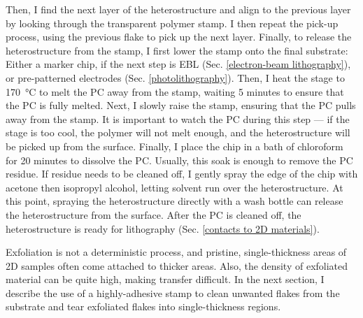 \documentclass[double,12pt,1in,seploa]{beavtex}
\begin{document}
Then, I find the next layer of the heterostructure and align to the previous layer by looking through the transparent polymer stamp. I then repeat the pick-up process, using the previous flake to pick up the next layer. Finally, to release the heterostructure from the stamp, I first lower the stamp onto the final substrate: Either a marker chip, if the next step is EBL (Sec. \ref{electron-beam lithography}), or pre-patterned electrodes (Sec. \ref{photolithography}). Then, I heat the stage to \SI{170}{\celsius} to melt the PC away from the stamp, waiting 5 minutes to ensure that the PC is fully melted. Next, I slowly raise the stamp, ensuring that the PC pulls away from the stamp. It is important to watch the PC during this step — if the stage is too cool, the polymer will not melt enough, and the heterostructure will be picked up from the surface. Finally, I place the chip in a bath of chloroform for 20 minutes to dissolve the PC. Usually, this soak is enough to remove the PC residue. If residue needs to be cleaned off, I gently spray the edge of the chip with acetone then isopropyl alcohol, letting solvent run over the heterostructure. At this point, spraying the heterostructure directly with a wash bottle can release the heterostructure from the surface. After the PC is cleaned off, the heterostructure is ready for lithography (Sec. \ref{contacts to 2D materials}).

Exfoliation is not a deterministic process, and pristine, single-thickness areas of 2D samples often come attached to thicker areas. Also, the density of exfoliated material can be quite high, making transfer difficult. In the next section, I describe the use of a highly-adhesive stamp to clean unwanted flakes from the substrate and tear exfoliated flakes into single-thickness regions.





\begin{center}

    \linespread{1.0}\selectfont

\end{center}
\end{document}
